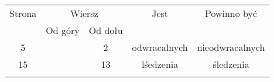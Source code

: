 \documentclass[a4paper,11pt]{article}
\numberwithin{equation}{section}
\begin{document}
\noindent
{}




\begin{center}

  \begin{tabular}{|c|c|c|c|c|}
    \hline
    Strona & \multicolumn{2}{c|}{Wiersz} & Jest
    & Powinno być \\ \cline{2-3}
    & Od góry & Od dołu &  &  \\ \hline
    5 & & 2 & odwracalnych & nieodwracalnych \\
    15 & & 13 & lśedzenia & śledzenia \\
    & & & & \\ \hline
  \end{tabular}

\end{center}

\VerSpaceTwo















\printbibliography





\end{document}
